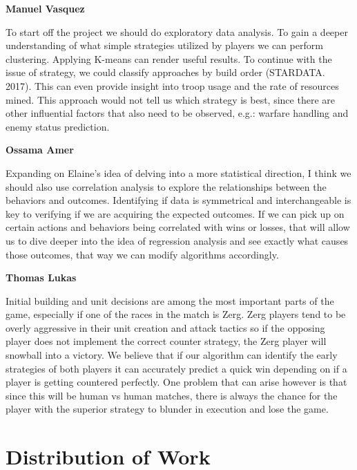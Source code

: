 \documentclass[a4paper,12pt]{report}
\newcommand{\msection}[1]{\noindent\textbf{#1}}
\begin{document}
\msection{Manuel Vasquez}

To start off the project we should do exploratory data analysis. To gain a deeper understanding of what simple strategies utilized by players we can perform clustering. Applying K-means can render useful results. To continue with the issue of strategy, we could classify approaches by build order (STARDATA. 2017). This can even provide insight into troop usage and the rate of resources mined. This approach would not tell us which strategy is best, since there are other influential factors that also need to be observed, e.g.: warfare handling and enemy status prediction.

\msection{Ossama Amer}

Expanding on Elaine’s idea of delving into a more statistical direction, I think we should also use correlation analysis to explore the relationships between the behaviors and outcomes. Identifying if data is symmetrical and interchangeable is key to verifying if we are acquiring the expected outcomes. If we can pick up on certain actions and behaviors being correlated with wins or losses, that will allow us to dive deeper into the idea of regression analysis and see exactly what causes those outcomes, that way we can modify algorithms accordingly.

\msection{Thomas Lukas}

Initial building and unit decisions are among the most important parts of the game, especially if one of the races in the match is Zerg. Zerg players tend to be overly aggressive in their unit creation and attack tactics so if the opposing player does not implement the correct counter strategy, the Zerg player will snowball into a victory. We believe that if our algorithm can identify the early strategies of both players it can accurately predict a quick win depending on if a player is getting countered perfectly. One problem that can arise however is that since this will be human vs human matches, there is always the chance for the player with the superior strategy to blunder in execution and lose the game.

\section{Distribution of Work}
\end{document}
